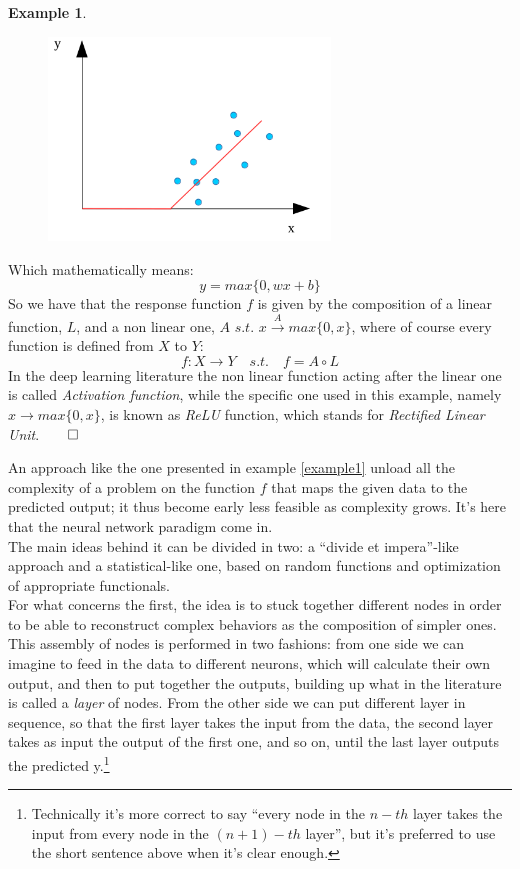 \documentclass[12pt, a4paper]{report}
\theoremstyle{definition}
\newtheorem{Example}{Example}
\begin{document}
{\begin{Example}
\begin{figure}[H]
	\centering
	\includegraphics[width=7.5cm]{img/regression2} 
	\caption{}
\end{figure}
\noindent Which mathematically means:
\[
y=max\{0,wx+b\}
\]
So we have that the response function $f$ is given by the composition of a linear function, $L$, and a non linear one, $A\,\,s.t.\,\, x\overset{A}{\longrightarrow}max\{0,x\}$, where of course every function is defined from $X$ to $Y$:
\[
f:X\rightarrow Y\quad s.t.\quad f=A\circ L
\]
In the deep learning literature the non linear function acting after the linear one is called \textit{Activation function}, while the specific one used in this example, namely $x\rightarrow max\{0,x\}$, is known as \textit{ReLU} function, which stands for \textit{Rectified Linear Unit}.$\qed$
\end{Example}
\noindent An approach like the one presented in example \ref{example1} unload all the complexity of a problem on the function $f$ that maps the given data to the predicted output; it thus become early less feasible as complexity grows. It's here that the neural network paradigm come in.\\
The main ideas behind it can be divided in two: a ``divide et impera''-like approach and a statistical-like one, based on random functions and optimization of appropriate functionals.\\
For what concerns the first, the idea is to stuck together different nodes in order to be able to reconstruct complex behaviors as the composition of simpler ones. This assembly of nodes is performed in two fashions: from one side we can imagine to feed in the data to different neurons, which will calculate their own output, and then to put together the outputs, building up what in the literature is called a \textit{layer} of nodes. From the other side we can put different layer in sequence, so that the first layer takes the input from the data, the second layer takes as input the output of the first one, and so on, until the last layer outputs the predicted y.\footnote{Technically it's more correct to say ``every node in the $n\!-\!th$ layer takes the input from every node in the $(n+1)\!-\!th$ layer'', but it's preferred to use the short sentence above when it's clear enough.}\\
}
\end{document}
